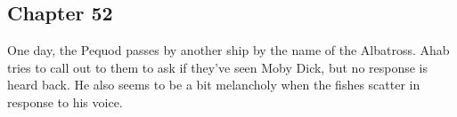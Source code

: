 \subsection{Chapter 52}

One day, the Pequod passes by another ship by the name of the Albatross. Ahab
tries to call out to them to ask if they've seen Moby Dick, but no response is
heard back. He also seems to be a bit melancholy when the fishes scatter in
response to his voice.
